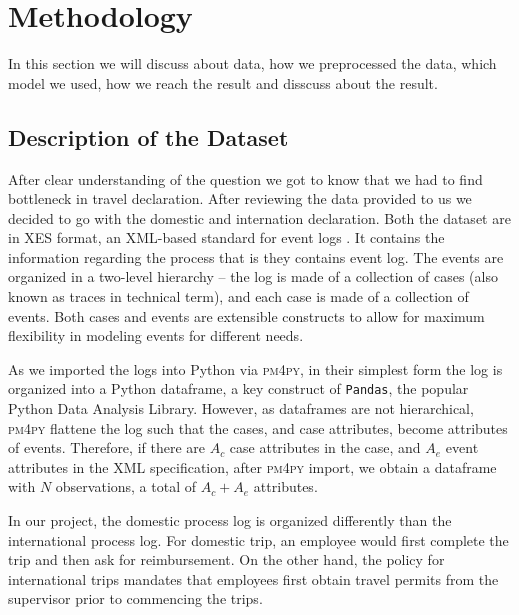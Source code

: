\documentclass[conference]{IEEEtran}
\begin{document}
\section{Methodology}
\label{section-methodology}

In this section we will discuss about data, how we preprocessed the data, which model we used, how we reach the result and disscuss about the result.

\subsection{Description of the Dataset}

After clear understanding of the question we got to know that we had to
 find bottleneck in travel declaration.
After reviewing the data provided to us we  decided to go with the domestic
and internation declaration.
Both the dataset are in XES format,
an XML-based standard for event logs \cite{XES2021}.
It contains the information regarding the process that is
they contains event log. The events are organized in a two-level hierarchy --
the log is made of a collection of cases (also known as traces in technical
term), and each case is made of a collection of events. Both cases and
events are extensible constructs to allow for maximum flexibility in
modeling events for different needs.



As we imported the logs into Python via \textsc{pm4py}, in their simplest form the
log is organized into a Python dataframe, a key construct of
\texttt{Pandas}, the popular Python Data Analysis Library. However, as
dataframes are not hierarchical, \textsc{pm4py} flattene the log such that the
cases, and case attributes, become attributes of events. Therefore, if
there are $A_c$ case attributes in the case, and $A_e$ event attributes in the
XML specification, after \textsc{pm4py} import, we obtain a dataframe 
with $N$ observations, a total of $A_c + A_e$ attributes.

In our project,
the domestic process log is organized differently than
the international process log.  For domestic trip, an employee would first
complete the trip and then ask for reimbursement. On the other hand,
the policy for international trips mandates that
employees first obtain travel permits from the supervisor prior to
commencing the trips.
\end{document}

